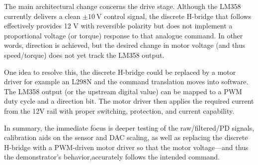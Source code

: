 The main architectural change concerns the drive stage. Although the LM358 currently delivers a clean $\pm 10~\text{V}$ control signal, the discrete H-bridge that follows effectively provides 12 V with reversible polarity but does not implement a proportional voltage (or torque) response to that analogue command. In other words, direction is achieved, but the desired change in motor voltage (and thus speed/torque) does not yet track the LM358 output.

One idea to resolve this, the discrete H-bridge could be replaced by a motor driver for example an L298N and the command translation moves into software. The LM358 output (or the upstream digital value) can be mapped to a \ac{PWM} duty cycle and a direction bit. The motor driver then applies the required current from the 12V rail with proper switching, protection, and current capability. 

In summary, the immediate focus is deeper testing of the raw/filtered/PD signals, calibration aids on the sensor and \ac{DAC} scaling, as well as replacing the discrete H-bridge with a PWM-driven motor driver so that the motor voltage—and thus the demonstrator’s behavior,accurately follows the intended command.
\newpage